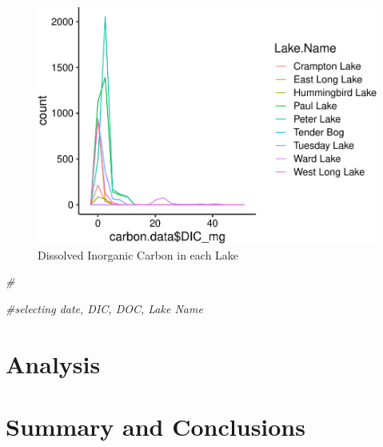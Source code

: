 \documentclass[12pt,]{article}
\newenvironment{Shaded}{\begin{snugshade}}{\end{snugshade}}
\newcommand{\CommentTok}[1]{\textcolor[rgb]{0.56,0.35,0.01}{\textit{#1}}}
\begin{document}
\begin{figure}
\centering
\includegraphics{Watson_ENV872_Project_files/figure-latex/unnamed-chunk-4-1.pdf}
\caption{\label{fig:fig2}Dissolved Inorganic Carbon in each Lake}
\end{figure}

\begin{Shaded}
\begin{Highlighting}[]
\CommentTok{#}
\end{Highlighting}
\end{Shaded}

\begin{Shaded}
\begin{Highlighting}[]
\CommentTok{#selecting date, DIC, DOC, Lake Name}
\end{Highlighting}
\end{Shaded}

\newpage

\section{Analysis}\label{analysis}

\newpage

\section{Summary and Conclusions}\label{summary-and-conclusions}
\end{document}
